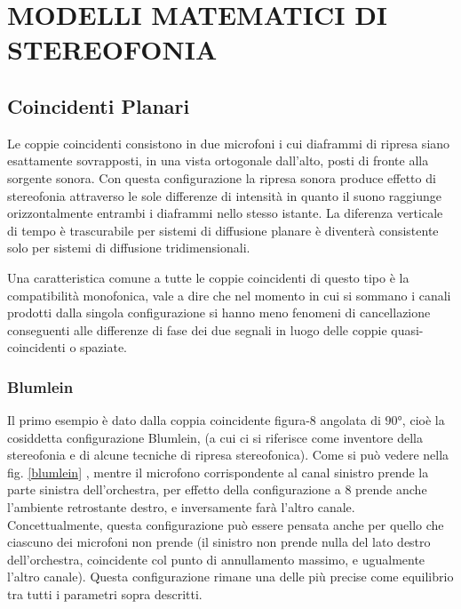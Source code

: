 \section*{MODELLI MATEMATICI DI\\ STEREOFONIA}

\subsection*{Coincidenti Planari}
Le coppie coincidenti consistono in due microfoni i cui diaframmi di ripresa
siano esattamente sovrapposti, in una vista ortogonale dall’alto, posti di
fronte alla sorgente sonora. Con questa configurazione la ripresa sonora produce
effetto di stereofonia attraverso le sole differenze di intensità in quanto il
suono raggiunge orizzontalmente entrambi i diaframmi nello stesso istante.
La diferenza verticale di tempo è trascurabile per sistemi di diffusione planare
è diventerà consistente solo per sistemi di diffusione tridimensionali.

Una caratteristica comune a tutte le coppie coincidenti di questo tipo è la
compatibilità monofonica, vale a dire che nel momento in cui si sommano i canali
prodotti dalla singola configurazione si hanno meno fenomeni di cancellazione
conseguenti alle differenze di fase dei due segnali in luogo delle coppie
quasi-coincidenti o spaziate.
\subsubsection*{Blumlein}
Il primo esempio è dato dalla coppia coincidente figura-8 angolata di $90°$,
cioè la cosiddetta configurazione Blumlein, (a cui ci si riferisce come
inventore della stereofonia e di alcune tecniche di ripresa stereofonica). Come
si può vedere nella fig. \ref{blumlein} , mentre il microfono corrispondente al canal
sinistro prende la parte sinistra dell’orchestra, per effetto della configurazione
a 8 prende anche l’ambiente retrostante destro, e inversamente farà l’altro canale.
Concettualmente, questa configurazione può essere pensata anche per quello che
ciascuno dei microfoni non prende (il sinistro non prende nulla del lato destro
dell’orchestra, coincidente col punto di annullamento massimo, e ugualmente
l’altro canale). Questa configurazione rimane una delle più precise come
equilibrio tra tutti i parametri sopra descritti.

